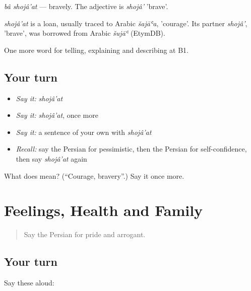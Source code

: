 \emph{bâ shojâ'at} — bravely. The adjective is \emph{shojâ'} 'brave'.

\begin{cousinweb}
\emph{shojâ'at} is a loan, usually traced to Arabic \emph{šajāʿa}, 'courage'. Its partner \emph{shojâ'}, 'brave', was borrowed from Arabic \emph{šujāʿ} (EtymDB).
\end{cousinweb}

\begin{grammarlens}[title={What you've built}]
One more word for telling, explaining and describing at B1.
\end{grammarlens}

\subsection*{Your turn}
\begin{itemize}
\raggedright
  \item \emph{Say it:} \emph{shojâ'at}
  \item \emph{Say it:} \emph{shojâ'at}, once more
  \item \emph{Say it:} a sentence of your own with \emph{shojâ'at}
  \item \emph{Recall:} say the Persian for pessimistic, then the Persian for self-confidence, then say \emph{shojâ'at} again
\end{itemize}

\begin{tcolorbox}[breakable,colback=teal!4,colframe=teal!35!black,title={Before you move on}]
What does  mean? (\textquotedblleft{}Courage, bravery\textquotedblright{}.) Say it once more.
\end{tcolorbox}
\section[(dialogue)]{Feelings, Health and Family}

\label{lesson:FA-R487-review-480-487}



\begin{quote}
Say the Persian for pride and arrogant.
\end{quote}

\subsection*{Your turn}
Say these aloud:

